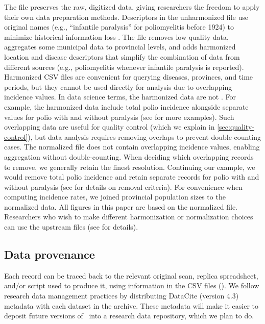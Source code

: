 \documentclass[12pt]{article}
\begin{document}
The  file preserves the raw, digitized data, giving researchers the freedom to apply their own data preparation methods. Descriptors in the unharmonized file use original names (e.g., ``infantile paralysis'' for poliomyelitis before 1924) to minimize historical information loss \cite{torres2022harmonization}. The  file removes low quality data, aggregates some municipal data to provincial levels, and adds harmonized location and disease descriptors that simplify the combination of data from different sources (e.g., poliomyelitis whenever infantile paralysis is reported). Harmonized CSV files are convenient for querying diseases, provinces, and time periods, but they cannot be used directly for analysis due to overlapping incidence values. In data science terms, the harmonized data are not  \cite{tidydata,cheng2024general}. For example, the harmonized data include total polio incidence alongside separate values for polio with and without paralysis (see  for more examples). Such overlapping data are useful for quality control (which we explain in \cref{sec:quality-control}), but data analysis requires removing overlaps to prevent double-counting cases. The normalized file does not contain overlapping incidence values, enabling aggregation without double-counting. When deciding which overlapping records to remove, we generally retain the finest resolution. Continuing our example, we would remove total polio incidence and retain separate records for polio with and without paralysis (see  for details on removal criteria). For convenience when computing incidence rates, we joined provincial population sizes to the normalized data. All figures in this paper are based on the normalized file. Researchers who wish to make different harmonization or normalization choices can use the upstream files (see  for details).

\subsection{Data provenance}\label{sec:data-provenance}

Each record can be traced back to the relevant original scan, replica spreadsheet, and/or script used to produce it, using information in the CSV files (). We follow research data management practices by distributing DataCite \cite{datacite_metadata_schema} (version 4.3) metadata with each dataset in the archive. These metadata will make it easier to deposit future versions of \datacronym\ into a research data repository, which we plan to do.
\end{document}
